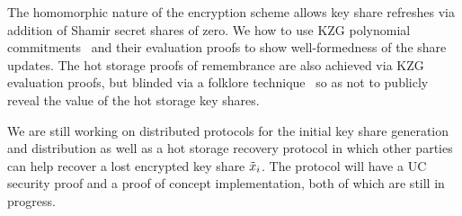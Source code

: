The homomorphic nature of the encryption scheme allows key share refreshes via addition of Shamir secret shares of zero. We how to use KZG polynomial commitments~\cite{AC:KatZavGol10} and their evaluation proofs to show well-formedness of the share updates. The hot storage proofs of remembrance are also achieved via KZG evaluation proofs, but blinded via a folklore technique~\cite[\S2.5]{EC:CHMMVW20} so as not to publicly reveal the value of the hot storage key shares.

We are still working on distributed protocols for the initial key share generation and distribution as well as a hot storage recovery protocol in which other parties can help recover a lost encrypted key share $\tilde{x}_i$.
The protocol will have a UC security proof and a proof of concept implementation, both of which are still in progress.